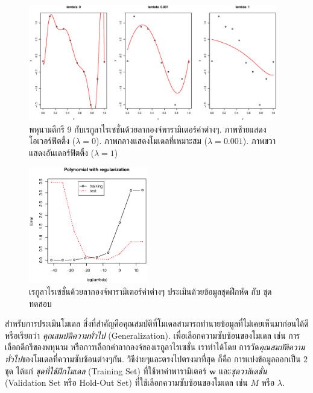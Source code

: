 %
\begin{figure}
\begin{center}
\includegraphics[height=2in]{02Background/bgPolyM9regLambdas.eps}
\end{center}
\caption{พหุนามดีกรี 9 กับเรกูลาไรเซชั่นด้วยลากองจ์พารามิเตอร์ค่าต่างๆ.
ภาพซ้ายแสดงโอเวอร์ฟิตติ้ง ($\lambda = 0$).
ภาพกลางแสดงโมเดลที่เหมาะสม ($\lambda = 0.001$).
ภาพขวาแสดงอันเดอร์ฟิตติ้ง ($\lambda = 1$)}
\label{fig: bg poly M9 reg different lambdas}
\end{figure}
%

%
\begin{figure}
\begin{center}
\includegraphics[height=2in]{02Background/bgPolyM9regTrainTest.eps}
\end{center}
\caption{เรกูลาไรเซชั่นด้วยลากองจ์พารามิเตอร์ค่าต่างๆ ประเมินด้วยข้อมูลชุดฝึกหัด กับ ชุดทดสอบ}
\label{fig: bg poly regularization evaluation}
\end{figure}
%

สำหรับการประเมินโมเดล สิ่งที่สำคัญคือคุณสมบัติที่โมเดลสามารถทำนายข้อมูลที่ไม่เคยเห็นมาก่อนได้ดี 
หรือเรียกว่า \textit{คุณสมบัติความทั่วไป} (Generalization).  
เพื่อเลือกความซับซ้อนของโมเดล เช่น การเลือกดีกรีของพหุนาม หรือการเลือกค่าลากองจ์ของเรกูลาไรเซชั่น 
เราทำได้โดย การวัด\textit{คุณสมบัติความทั่วไป}ของโมเดลที่ความซับซ้อนต่างๆกัน.
วิธีง่ายๆและตรงไปตรงมาที่สุด ก็คือ การแบ่งข้อมูลออกเป็น $2$ ชุด
ได้แก่ \textit{ชุดที่ใช้ฝึกโมเดล} (Training Set) ที่ใช้หาค่าพารามิเตอร์ $\mathbf{w}$ 
และ\textit{ชุดวาลิเดชั่น} (Validation Set หรือ Hold-Out Set)   ที่ใช้เลือกความซับซ้อนของโมเดล เช่น $M$ หรือ $\lambda$.

